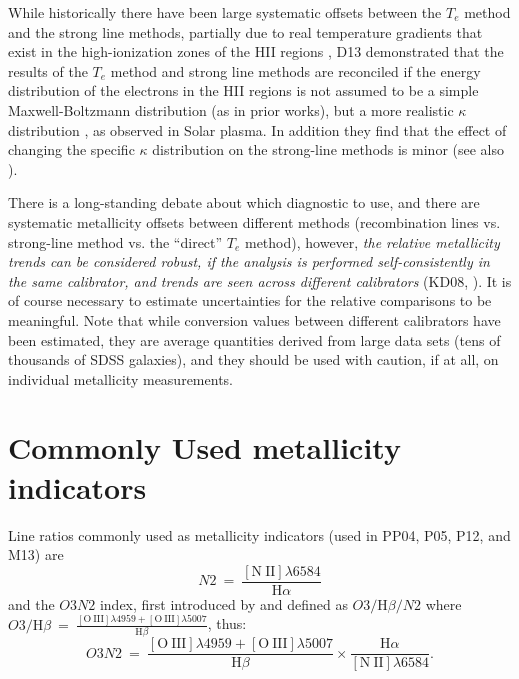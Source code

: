 \documentclass{emulateapj}
\newcommand{\ha}{\ensuremath{\mathrm{H}\alpha}}
\newcommand{\hb}{\ensuremath{\mathrm{H}\beta}}
\begin{document}
While historically there have been large systematic offsets between
the $T_e$ method and the strong line methods, partially due to real
temperature gradients that exist in the high-ionization zones of the
HII regions \citep{lopezsanchez12}, D13 demonstrated that the results
of the $T_e$ method and strong line methods are reconciled if the
energy distribution of the electrons in the HII regions is not assumed
to be a simple Maxwell-Boltzmann distribution (as in prior works), but
a more realistic $\kappa$ distribution \citep{vasyliunas68, owoki83},
as observed in Solar plasma. In addition they find that the effect of
changing the specific $\kappa$ distribution on the strong-line methods
is minor (see also \citealt{Mendoza14}).


There is a long-standing debate about which diagnostic to use, and
there are systematic metallicity offsets between different methods
(recombination lines vs. strong-line method vs. the ``direct'' $T_e$
method), however, \emph{the relative metallicity trends can be
  considered robust, if the analysis is performed self-consistently in
  the same calibrator, and trends are seen across different
  calibrators} (KD08, \citealt{moustakas10}). It is of course
necessary to estimate uncertainties for the relative comparisons to be
meaningful. Note that while conversion values between different
calibrators \citep{kewley08} have been estimated, they are average
quantities derived from large data sets (tens of thousands of SDSS
galaxies), and they should be used with caution, if at all, on
individual metallicity measurements.

\section{Commonly Used metallicity indicators}
Line ratios commonly used as metallicity indicators (used in PP04,
P05, P12, and M13) are $$N2~=~\frac{\mathrm{[N~II]}\lambda6584}{\ha}$$
and the $O3N2$ index, first introduced by \citet{alloin79} and defined
as $O3/\hb/N2$ where $O3/\hb~=~
\frac{\mathrm{[O~III]}\lambda4959+\mathrm{[O~III]}\lambda5007}{\hb}$,
thus:
$$O3N2~=~\frac{\mathrm{[O~III]}\lambda4959+\mathrm{[O~III]}\lambda5007}{\hb}
\times \frac{\ha}{\mathrm{[N~II]}\lambda6584}.$$


\end{document}
